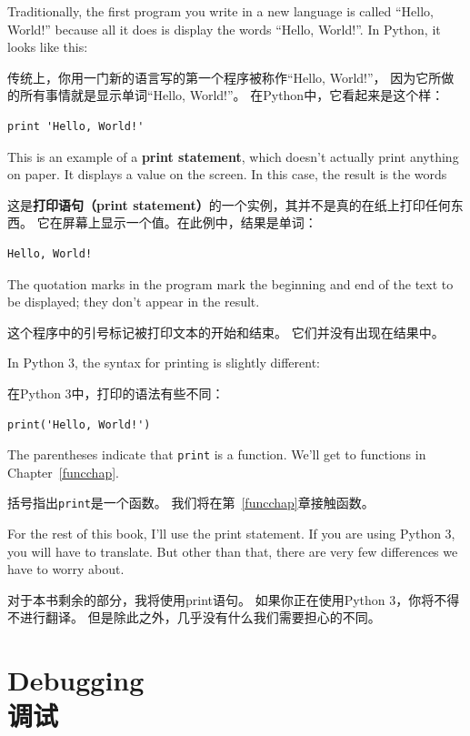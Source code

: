 \documentclass[10pt]{book}
\begin{document}
\begin{CJK}{UTF8}{gbsn}
Traditionally, the first program you write in a new language
is called ``Hello, World!'' because all it does is display the
words ``Hello, World!''.  In Python, it looks like this:

传统上，你用一门新的语言写的第一个程序被称作``Hello, World!''，
因为它所做的所有事情就是显示单词``Hello, World!''。
在Python中，它看起来是这个样：

\begin{verbatim}
print 'Hello, World!'
\end{verbatim}
%
This is an example of a {\bf print statement}, which
doesn't actually print anything on paper.  It displays a value on the
screen.  In this case, the result is the words

这是{\bf 打印语句（print statement）}的一个实例，其并不是真的在纸上打印任何东西。
它在屏幕上显示一个值。在此例中，结果是单词：

\begin{verbatim}
Hello, World!
\end{verbatim}
%
The quotation marks in the program mark the beginning and end
of the text to be displayed; they don't appear in the result.

这个程序中的引号标记被打印文本的开始和结束。
它们并没有出现在结果中。

In Python 3, the syntax for printing is slightly different:

在Python 3中，打印的语法有些不同：

\begin{verbatim}
print('Hello, World!')
\end{verbatim}
%
The parentheses indicate that {\tt print} is a function.  We'll get
to functions in Chapter~\ref{funcchap}.
  

括号指出{\tt print}是一个函数。
我们将在第~\ref{funcchap}章接触函数。

For the rest of this book, I'll use the print statement.  If you
are using Python 3, you will have to translate.  But other than
that, there are very few differences we have to worry about.

对于本书剩余的部分，我将使用print语句。
如果你正在使用Python 3，你将不得不进行翻译。
但是除此之外，几乎没有什么我们需要担心的不同。

\section{Debugging \\ 调试}


\end{CJK}
\end{document}
